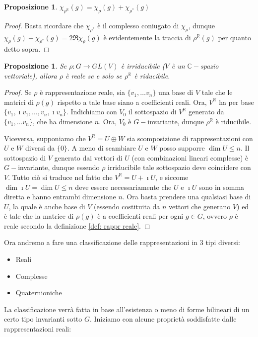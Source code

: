 \documentclass[11pt]{article}
\theoremstyle{plain}
\newtheorem{prop}[thm]{Proposizione}
\theoremstyle{definition}
\theoremstyle{remark}
\newcommand{\C}{\mathbb{C}}
\newcommand{\R}{\mathbb{R}}
\begin{document}
\begin{prop}
	$\chi_{\rho^\R}(g) = \chi_\rho(g) + \chi_{\rho^*}(g)$
\end{prop}
\begin{proof}
	Basta ricordare che $\chi_{\rho^*}$ è il complesso coniugato di $\chi_\rho$, dunque
	$\chi_\rho(g) + \chi_{\rho^*}(g) = 2\Re \chi_\rho(g)$ è evidentemente la traccia di $\rho^\R(g)$ per
	quanto detto sopra.
\end{proof}


\begin{prop}
	Se $\rho:G\to GL(V)$ è irriducibile ($V$ è un $\C-$spazio vettoriale), allora $\rho$ è reale se e solo se $\rho^\R$ è riducibile.
\end{prop}
\begin{proof}
	Se $\rho$ è rappresentazione reale, sia $\{v_1,\dots v_n\}$ una
	base di $V$ tale che le matrici di $\rho(g)$ rispetto a tale base siano a coefficienti reali.
	Ora, $V^\R$ ha per base $\{v_1, \imath v_1,\dots, v_n, \imath v_n\}$.
	Indichiamo con $V_0$ il sottospazio di $V^\R$ generato da $\{v_1,\dots v_n\}$, che ha dimensione $n$.
	Ora, $V_0$ è $G-$invariante, dunque $\rho^\R$ è riducibile.

	Viceversa, supponiamo che $V^\R = U \oplus W$ sia scomposizione di rappresentazioni
	con $U$ e $W$ diversi da $\{0\}$. A meno di scambiare $U$ e $W$ posso supporre $\dim U \le n$.
	Il sottospazio di $V$ generato dai vettori di $U$ (con combinazioni lineari complesse) è $G-$invariante,
	dunque essendo $\rho$ irriducibile tale sottospazio deve coincidere con $V$.
	Tutto ciò si traduce nel fatto che $V^\R = U + \imath U$, e siccome $\dim\imath U = \dim U \le n$
	deve essere necessariamente che $U$ e $\imath U$ sono in somma diretta e hanno
	entrambi dimensione $n$. Ora basta prendere una qualsiasi base di $U$,
	la quale è anche base di $V$ (essendo costituita da $n$ vettori che generano $V$) ed è tale che la matrice di $\rho(g)$ è
	a coefficienti reali per ogni $g\in G$, ovvero $\rho$ è reale secondo la definizione \ref{def: rappr reale}.
\end{proof}

Ora andremo a fare una classificazione delle rappresentazioni in 3 tipi diversi:
\begin{itemize}
\item Reali
\item Complesse
\item Quaternioniche
\end{itemize}
La classificazione verrà fatta in base all'esistenza o meno di forme bilineari di un certo tipo invarianti sotto $G$.
Iniziamo con alcune proprietà soddisfatte dalle rappresentazioni reali:
\end{document}
